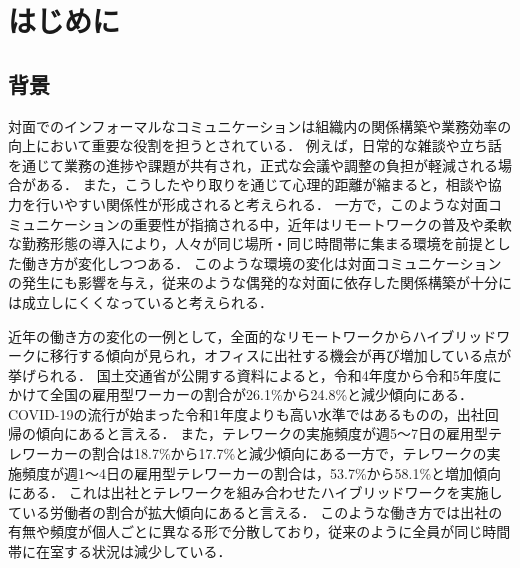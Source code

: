 \chapter{はじめに}
\thispagestyle{myheadings}


\section{背景}
\label{sec:schedule}
対面でのインフォーマルなコミュニケーションは組織内の関係構築や業務効率の向上において重要な役割を担うとされている\cite{inf}．
例えば，日常的な雑談や立ち話を通じて業務の進捗や課題が共有され，正式な会議や調整の負担が軽減される場合がある．
また，こうしたやり取りを通じて心理的距離が縮まると，相談や協力を行いやすい関係性が形成されると考えられる．
一方で，このような対面コミュニケーションの重要性が指摘される中，近年はリモートワークの普及や柔軟な勤務形態の導入により，人々が同じ場所・同じ時間帯に集まる環境を前提とした働き方が変化しつつある．
このような環境の変化は対面コミュニケーションの発生にも影響を与え，従来のような偶発的な対面に依存した関係構築が十分には成立しにくくなっていると考えられる．


%
近年の働き方の変化の一例として，全面的なリモートワークからハイブリッドワークに移行する傾向が見られ，オフィスに出社する機会が再び増加している点が挙げられる．
国土交通省が公開する資料\cite{tel}によると，令和4年度から令和5年度にかけて全国の雇用型ワーカーの割合が26.1\%から24.8\%と減少傾向にある．
COVID-19の流行が始まった令和1年度よりも高い水準ではあるものの，出社回帰の傾向にあると言える．
また，テレワークの実施頻度が週5〜7日の雇用型テレワーカーの割合は18.7\%から17.7\%と減少傾向にある一方で，テレワークの実施頻度が週1〜4日の雇用型テレワーカーの割合は，53.7\%から58.1\%と増加傾向にある．
これは出社とテレワークを組み合わせたハイブリッドワークを実施している労働者の割合が拡大傾向にあると言える．
このような働き方では出社の有無や頻度が個人ごとに異なる形で分散しており，従来のように全員が同じ時間帯に在室する状況は減少している．

